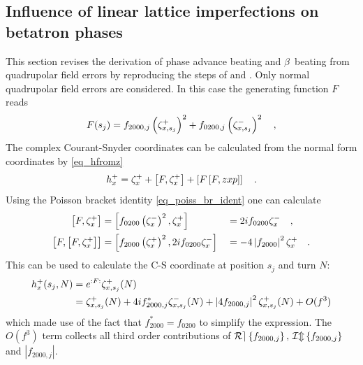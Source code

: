 \subsection{Influence of linear lattice imperfections on betatron phases}
\label{sec:deriv}
\label{sec_phase_beating}

This section revises the derivation of phase advance beating and $\beta$~beating from quadrupolar field errors
by reproducing the steps of \cite{Franchi2014} and \cite{Franchi2016}. 
Only normal quadrupolar field errors are considered.
In this case the generating function $F$ reads
%
\begin{equation}
  F(s_j) = f_{2000,j} \left( \zeta_{x,s_j}^+ \right) ^2 + f_{0200,j} \left( \zeta_{x,s_j}^- \right)^2 \notag
  \quad ,
  \label{eq_F_quad}
\end{equation}
%
The complex Courant-Snyder coordinates can be calculated from the normal form coordinates by
\eqref{eq_hfromz}
%
\begin{equation}
    h_x^+ = \zeta_x^+ + \left[ F, \zeta_x^+ \right] + \left[ F \left[ F, zxp \right] \right]
    \quad .
\end{equation}
%
Using the Poisson bracket identity \eqref{eq_poiss_br_ident} one can calculate
%
\begin{align}
     \left[ F, \zeta_x^+ \right]  &= \left[f_{0200} \left(\zeta_x^-\right)^{2}, \zeta_x^+ \right] & &= 2i f_{0200} \zeta_x^- \quad ,\notag \\
     \left[ F, \left[ F, \zeta_x^+ \right]\right] &= \left[f_{2000} \left(\zeta_x^+\right)^{2}, 2i f_{0200} \zeta_x^- \right]
     & &= -4 \left| f_{2000}\right|^2 \zeta_x^+
     \quad .
\end{align}
%
This can be used to calculate the C-S coordinate at position $s_j$ and turn $N$:
%
\begin{align}
  h_x^+(s_j, N) &= e^{:F:}\zeta_{x,s_j}^+(N) \notag \\
  &= \zeta_{x,s_j}^+(N) + 4if_{2000,j}^* \zeta_{x,s_j}^-(N) 
  + \left| 4 f_{2000,j} \right|^2 \zeta_{x, s_j}^+(N) +
  O(f^3)
  \label{eq_h_2ndorder}
\end{align}
%
which made use of the fact that $f_{2000}^* = f_{0200}$ to simplify the expression.
The $O(f^3) $ term collects all third order contributions of $\mathcal{Re} \left\{ f_{2000,j} \right\},\,\mathcal{Im} \left\{ f_{2000,j} \right\}$ and 
$\left| f_{2000,j}\right|$.

